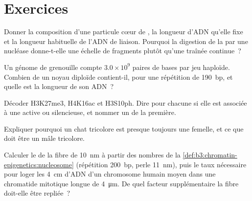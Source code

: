 \section{Exercices}

\begin{exercise}[$\star$]\label{exo:b3:chromatin-epigenetics:1}
Donner la composition d'une particule cœur de , la longueur
d'ADN qu'elle fixe et la longueur habituelle de l'ADN de liaison.
Pourquoi la digestion de la  par une nucléase donne-t-elle
une échelle de fragments plutôt qu'une traînée continue~?
\end{exercise}

\begin{exercise}[$\star$]\label{exo:b3:chromatin-epigenetics:2}
Un génome de grenouille compte $3.0\times 10^{9}$ paires de bases par
jeu haploïde. Combien de  un noyau diploïde contient-il,
pour une répétition de \qty{190}{bp}, et quelle est la longueur de son
ADN~?
\end{exercise}

\begin{exercise}[$\star$]\label{exo:b3:chromatin-epigenetics:3}
Décoder H3K27me3, H4K16ac et H3S10ph. Dire pour chacune si elle est
associée à une  active ou silencieuse, et nommer un 
de la première.
\end{exercise}

\begin{exercise}[$\star$]\label{exo:b3:chromatin-epigenetics:4}
Expliquer pourquoi un chat tricolore est presque toujours une femelle,
et ce que doit être un mâle tricolore.
\end{exercise}

\begin{exercise}[$\star\star$]\label{exo:b3:chromatin-epigenetics:5}
Calculer le  de la fibre de \qty{10}{nm} à partir des
nombres de la \cref{def:b3:chromatin-epigenetics:nucleosome}
(répétition \qty{200}{bp}, perle \qty{11}{nm}), puis le taux nécessaire
pour loger les \qty{4}{cm} d'ADN d'un chromosome humain moyen dans une
chromatide mitotique longue de \qty{4}{\micro m}. De quel facteur
supplémentaire la fibre doit-elle être repliée~?
\end{exercise}


